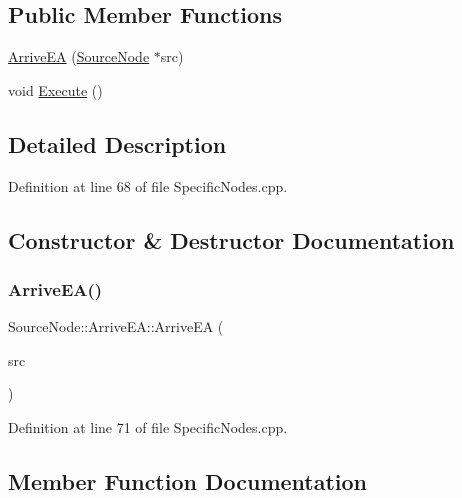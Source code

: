 \subsection*{Public Member Functions}
\begin{DoxyCompactItemize}
\item 
\hyperlink{class_source_node_1_1_arrive_e_a_a6f956c34a412bb62b957b652cef8b19a}{Arrive\+EA} (\hyperlink{class_source_node}{Source\+Node} $\ast$src)
\item 
void \hyperlink{class_source_node_1_1_arrive_e_a_a622b2282aae023818b26d39519143c15}{Execute} ()
\end{DoxyCompactItemize}


\subsection{Detailed Description}


Definition at line 68 of file Specific\+Nodes.\+cpp.



\subsection{Constructor \& Destructor Documentation}
\mbox{\label{class_source_node_1_1_arrive_e_a_a6f956c34a412bb62b957b652cef8b19a}} 
\subsubsection{\texorpdfstring{Arrive\+E\+A()}{ArriveEA()}}
{\footnotesize\ttfamily Source\+Node\+::\+Arrive\+E\+A\+::\+Arrive\+EA (\begin{DoxyParamCaption}\item[{\hyperlink{class_source_node}{Source\+Node} $\ast$}]{src }\end{DoxyParamCaption})\hspace{0.3cm}{\ttfamily [inline]}}



Definition at line 71 of file Specific\+Nodes.\+cpp.



\subsection{Member Function Documentation}
\mbox{\label{class_source_node_1_1_arrive_e_a_a622b2282aae023818b26d39519143c15}} 
